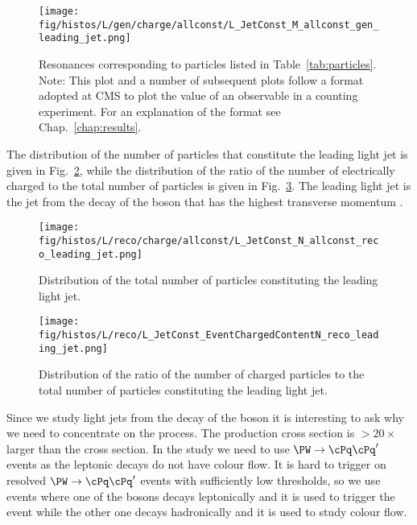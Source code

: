   \begin{figure}[hbtp]
    \centering
    \def\twidth{0.45}
    \texttt{[image: fig/histos/L/gen/charge/allconst/L\_JetConst\_M\_allconst\_gen\_leading\_jet.png]}
    \caption{Resonances corresponding to particles listed in Table~\protect\ref{tab:particles}.\\
    \small Note: This plot and a number of subsequent plots follow a format adopted at CMS to plot the value of an observable in a counting experiment. For an explanation of the format see Chap.~\protect\ref{chap:results}.}
    \label{fig:mass_resonances}
  \end{figure}

  The distribution of the number of particles that constitute the leading light jet is given in Fig.~\ref{fig:number}, while the distribution of the ratio of the number of electrically charged to the total number of particles is given in Fig.~\ref{fig:charged_content}. The leading light jet is the jet from the decay of the \PW boson that has the highest transverse momentum \pt.

  \begin{figure}[hbtp]
    \centering
    \def\twidth{0.45}
    \texttt{[image: fig/histos/L/reco/charge/allconst/L\_JetConst\_N\_allconst\_reco\_leading\_jet.png]}
    \caption{Distribution of the total number of particles constituting the leading light jet.}
    \label{fig:number}

\end{figure}
     \begin{figure}[hbtp]
     \centering
     \def\twidth{0.45}
     \texttt{[image: fig/histos/L/reco/L\_JetConst\_EventChargedContentN\_reco\_leading\_jet.png]}
     \caption{Distribution of the ratio of the number of charged particles to the total number of particles constituting the leading light jet.}
  \label{fig:charged_content}
   \end{figure}

Since we study light jets from the decay of the \PW boson it is interesting to ask why we need to concentrate on the \ttbar process. The \PW production cross section is $>20\times$ larger than the \ttbar cross section. In the study we need to use  $\PW\rightarrow\cPq\cPq'$ events as the leptonic decays do not have colour flow. It is hard to trigger on resolved $\PW\rightarrow\cPq\cPq'$ events with sufficiently low \pt thresholds, so we use \ttbar events where one of the \PW bosons decays leptonically and it is used to trigger the event while the other one decays hadronically and it is used to study colour flow.

